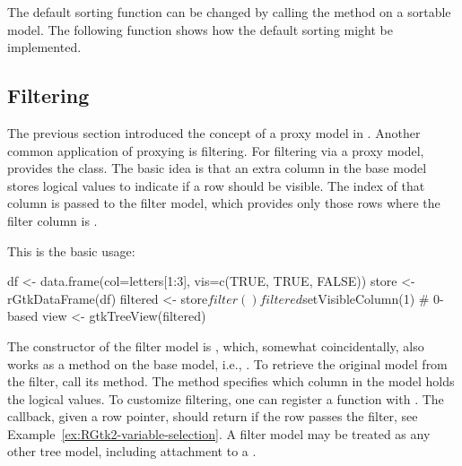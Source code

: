 The default sorting function can be changed by calling the method
 on a sortable model.  The
following function shows how the default sorting might be implemented.
\begin{Schunk}
\end{Schunk}


\subsection{Filtering}
\label{sec:RGtk2:mvc:filtering}

The previous section introduced the concept of a proxy model in
. Another common application of proxying is
filtering.  For filtering via a proxy model, \GTK\/ provides the
 class. The basic idea is that an extra
column in the base model stores logical values to indicate if a row
should be visible. The index of that column is passed to the filter
model, which provides only those rows where the filter column is
.

This is the basic usage:
\begin{Schunk}
\begin{Sinput}
 df <- data.frame(col=letters[1:3], vis=c(TRUE, TRUE, FALSE))
 store <- rGtkDataFrame(df)
 filtered <- store$filter()
 filtered$setVisibleColumn(1)            # 0-based
 view <- gtkTreeView(filtered)
\end{Sinput}
\end{Schunk}
%
The constructor of the filter model is ,
which, somewhat coincidentally, also works as a method on the base
model, i.e., . To retrieve the original model
from the filter, call its  method. The method
 specifies which column
in the model holds the logical values.  To customize filtering, one
can register a function with . The callback,
given a row pointer, should return  if the row passes the
filter, see Example~\ref{ex:RGtk2-variable-selection}. A filter model
may be treated as any other tree model, including attachment to a
.


